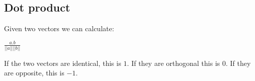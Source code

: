 
\subsection{Dot product}

Given two vectors we can calculate:

\(\frac{a.b}{||a|| ||b||}\)

If the two vectors are identical, this is \(1\). If they are orthogonal this is \(0\). If they are opposite, this is \(-1\).


